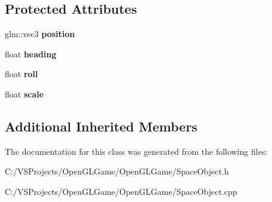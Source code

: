 \subsection*{Protected Attributes}
\begin{DoxyCompactItemize}
\item 
\hypertarget{class_space_object_a3e68af7f373b9ac71c17a427cf1cebec}{glm\-::vec3 {\bfseries position}}\label{class_space_object_a3e68af7f373b9ac71c17a427cf1cebec}

\item 
\hypertarget{class_space_object_a3362b5b565a3b39630973cfb0d047a7e}{float {\bfseries heading}}\label{class_space_object_a3362b5b565a3b39630973cfb0d047a7e}

\item 
\hypertarget{class_space_object_a5f18994b250967dcfa6a9d3bd3357d5f}{float {\bfseries roll}}\label{class_space_object_a5f18994b250967dcfa6a9d3bd3357d5f}

\item 
\hypertarget{class_space_object_a05a5b4896ea40270da4a9856eed08833}{float {\bfseries scale}}\label{class_space_object_a05a5b4896ea40270da4a9856eed08833}

\end{DoxyCompactItemize}
\subsection*{Additional Inherited Members}


The documentation for this class was generated from the following files\-:\begin{DoxyCompactItemize}
\item 
C\-:/\-V\-S\-Projects/\-Open\-G\-L\-Game/\-Open\-G\-L\-Game/Space\-Object.\-h\item 
C\-:/\-V\-S\-Projects/\-Open\-G\-L\-Game/\-Open\-G\-L\-Game/Space\-Object.\-cpp\end{DoxyCompactItemize}
